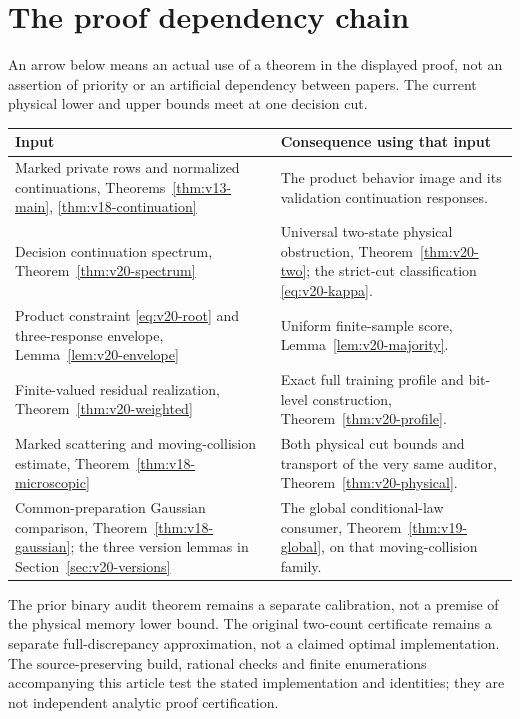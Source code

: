 \appendix
\section{The proof dependency chain}
\label{sec:v18-dependencies}
An arrow below means an actual use of a theorem in the displayed proof,
not an assertion of priority or an artificial dependency between papers.
The current physical lower and upper bounds meet at one decision cut.
\begin{center}
\begin{tabular}{p{}p{}}
\toprule
Input & Consequence using that input\\
\midrule
Marked private rows and normalized continuations,
Theorems~\ref{thm:v13-main}, \ref{thm:v18-continuation}
& The product behavior image and its validation continuation responses.\\[3pt]
Decision continuation spectrum,
Theorem~\ref{thm:v20-spectrum}
& Universal two-state physical obstruction,
Theorem~\ref{thm:v20-two}; the strict-cut classification
\eqref{eq:v20-kappa}.\\[3pt]
Product constraint \eqref{eq:v20-root} and three-response envelope,
Lemma~\ref{lem:v20-envelope}
& Uniform finite-sample score,
Lemma~\ref{lem:v20-majority}.\\[3pt]
Finite-valued residual realization,
Theorem~\ref{thm:v20-weighted}
& Exact full training profile and bit-level construction,
Theorem~\ref{thm:v20-profile}.\\[3pt]
Marked scattering and moving-collision estimate,
Theorem~\ref{thm:v18-microscopic}
& Both physical cut bounds and transport of the very same auditor,
Theorem~\ref{thm:v20-physical}.\\[3pt]
Common-preparation Gaussian comparison,
Theorem~\ref{thm:v18-gaussian}; the three version lemmas in
Section~\ref{sec:v20-versions}
& The global conditional-law consumer,
Theorem~\ref{thm:v19-global}, on that moving-collision family.\\
\bottomrule
\end{tabular}
\end{center}
The prior binary audit theorem remains a separate calibration, not a
premise of the physical memory lower bound. The original two-count
certificate remains a separate full-discrepancy approximation, not a
claimed optimal implementation. The source-preserving build, rational
checks and finite enumerations accompanying this article test the stated
implementation and identities; they are not independent analytic proof
certification.

